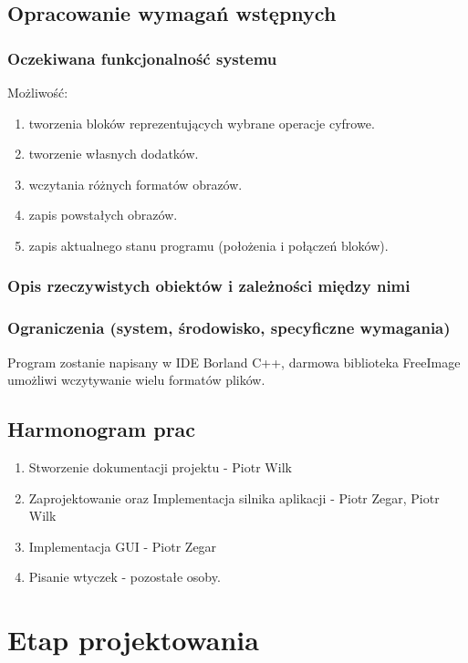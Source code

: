\documentclass[a4paper,10pt]{article}
\begin{document}
\subsection{Opracowanie wymagań wstępnych}
\subsubsection{Oczekiwana funkcjonalność systemu}
Możliwość:
\begin{enumerate}
 \item tworzenia bloków reprezentujących wybrane operacje cyfrowe.
 \item tworzenie własnych dodatków.
 \item wczytania różnych formatów obrazów.
 \item zapis powstałych obrazów.
 \item zapis aktualnego stanu programu (położenia i połączeń bloków).
\end{enumerate}
\subsubsection{Opis rzeczywistych obiektów i zależności między nimi}

\subsubsection{Ograniczenia (system, środowisko, specyficzne wymagania)}
Program zostanie napisany w IDE Borland C++, darmowa biblioteka FreeImage umożliwi wczytywanie wielu formatów plików.
\subsection{Harmonogram prac}
\begin{enumerate}
 \item Stworzenie dokumentacji projektu - Piotr Wilk
 \item Zaprojektowanie oraz Implementacja silnika aplikacji - Piotr Zegar, Piotr Wilk
 \item Implementacja GUI - Piotr Zegar
 \item Pisanie wtyczek - pozostałe osoby.
\end{enumerate}

\section{Etap projektowania}
\end{document}
